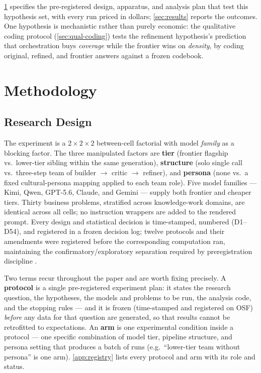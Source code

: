 \documentclass[12pt,a4paper]{article}
\begin{document}
\cref{sec:method} specifies the pre-registered design, apparatus, and analysis
plan that test this hypothesis set, with every run priced in dollars;
\cref{sec:results} reports the outcomes. One hypothesis is mechanistic rather
than purely economic: the qualitative coding protocol (\cref{sec:qual-coding})
tests the refinement hypothesis's prediction that orchestration buys
\emph{coverage} while the frontier wins on \emph{density}, by coding original,
refined, and frontier answers against a frozen codebook.



\section{Methodology}\label{sec:method}

\subsection{Research Design}

The experiment is a $2 \times 2 \times 2$ between-cell factorial with model
\emph{family} as a blocking factor. The three manipulated factors are
\textbf{tier} (frontier flagship vs.\ lower-tier sibling within the same
generation), \textbf{structure} (solo single call vs.\ three-step team of
builder $\to$ critic $\to$ refiner), and \textbf{persona} (none vs.\ a fixed
cultural-persona mapping applied to each team role). Five model families ---
Kimi, Qwen, GPT-5.6, Claude, and Gemini --- supply both frontier and cheaper
tiers. Thirty business problems, stratified across knowledge-work domains,
are identical across all cells; no instruction wrappers are added to the
rendered prompt. Every design and statistical decision is time-stamped, numbered
(D1--D54), and registered in a frozen decision log; twelve protocols and their
amendments were registered before the corresponding computation ran, maintaining
the confirmatory/exploratory separation required by preregistration discipline
\citep{NosekEtAl2018}.

Two terms recur throughout the paper and are worth fixing precisely. A
\textbf{protocol} is a single pre-registered experiment plan: it states the
research question, the hypotheses, the models and problems to be run, the
analysis code, and the stopping rules --- and it is frozen (time-stamped and
registered on OSF) \emph{before} any data for that question are generated, so
that results cannot be retrofitted to expectations. An \textbf{arm} is one
experimental condition inside a protocol --- one specific combination of model
tier, pipeline structure, and persona setting that produces a batch of runs
(e.g.\ ``lower-tier team without persona'' is one arm). \cref{app:registry}
lists every protocol and arm with its role and status.
\end{document}
